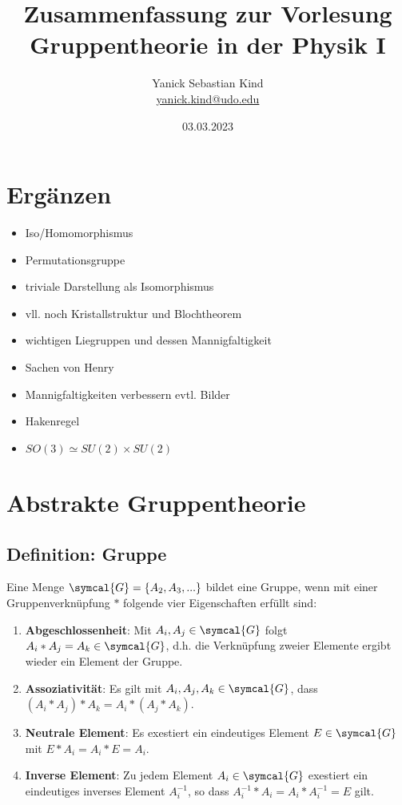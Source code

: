 \documentclass[
  captions=tableheading,  %
  titlepage=firstiscover, %
]{scrartcl}
\author{%
  Yanick Sebastian Kind\\%
  \href{mailto:yanick.kind@udo.edu}{yanick.kind@udo.edu}%
}
\title{Zusammenfassung zur Vorlesung Gruppentheorie in der Physik I}
\date{03.03.2023}
\begin{document}
\maketitle

\tableofcontents

\theoremstyle{remark}
\newtheorem{df}{Definition}
\listoftheorems


\newpage
\section{Ergänzen}
\begin{itemize}
  \item Iso/Homomorphismus
  \item Permutationsgruppe
  \item triviale Darstellung als Isomorphismus
  \item vll. noch Kristallstruktur und Blochtheorem 
  \item wichtigen Liegruppen und dessen Mannigfaltigkeit
  \item Sachen von Henry
  \item Mannigfaltigkeiten verbessern evtl. Bilder
  \item Hakenregel  
  \item $SO(3) \simeq SU(2) \times SU(2)$
\end{itemize}
\section{Abstrakte Gruppentheorie}
\subsection{Definition: Gruppe}
  Eine Menge $\symcal{G} = \{A_2,A_3,...\}$ bildet eine Gruppe, wenn mit einer Gruppenverknüpfung $*$ folgende vier Eigenschaften erfüllt sind:
  \begin{enumerate}
    \item \textbf{Abgeschlossenheit}: Mit $A_i, A_j \in \symcal{G}$ folgt $A_i * A_j = A_k \in \symcal{G}$, d.h. die Verknüpfung zweier 
    Elemente ergibt wieder ein Element der Gruppe.
    \item \textbf{Assoziativität}: Es gilt mit $A_i, A_j, A_k \in \symcal{G}$, dass $(A_i * A_j) * A_k = A_i * (A_j*A_k)$.
    \item \textbf{Neutrale Element}: Es exestiert ein eindeutiges Element $E\in \symcal{G}$ mit $E * A_i = A_i * E  = A_i$.
    \item \textbf{Inverse Element}: Zu jedem Element $A_i \in \symcal{G}$ exestiert ein eindeutiges inverses Element $A_i^{-1}$,
      so dass $A_i^{-1} * A_i = A_i * A_i^{-1} = E$ gilt.
  \end{enumerate}
\end{document}

